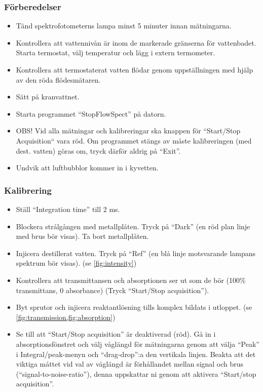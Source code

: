 \subsubsection{Förberedelser}
\begin{itemize}
\item Tänd spektrofotometerns lampa minst 5 minuter innan mätningarna.
\item Kontrollera att vattennivån är inom de markerade gränserna för vattenbadet.
Starta termostat, välj temperatur och lägg i extern termometer.
\item Kontrollera att termostaterat vatten flödar genom uppställningen
  med hjälp av den röda flödesmätaren.
\item Sätt på kranvattnet.
\item Starta programmet ``StopFlowSpect'' på datorn.
\item OBS! Vid alla mätningar och
  kalibreringar ska knappen för ``Start/Stop Acquisition`` vara röd. Om
  programmet stängs av måste kalibreringen (med dest. vatten) göras om,
  tryck därför aldrig på ``Exit''.
\item Undvik att luftbubblor kommer in i kyvetten.
\end{itemize}

\subsubsection{Kalibrering}
\begin{itemize}
\item Ställ ``Integration time'' till 2 ms.
\item Blockera strålgången med metallplåten. Tryck på ``Dark'' (en röd
  plan linje med brus bör visas). Ta bort
  metallplåten.
\item Injicera destillerat vatten. Tryck på ``Ref'' (en blå linje
  motsvarande lampans spektrum bör visas). (se \cref{fig:intensity})
\item Kontrollera att transmittansen och absorptionen ser ut som de
  bör (100\% transmittans, 0 absorbance) (Tryck ``Start/Stop acquisition'').
\item Byt sprutor och injicera reaktantlösning tills komplex bildats i
  utloppet. (se \cref{fig:transmission,fig:absorption})
\item Se till att ``Start/Stop acquisition'' är deaktiverad (röd). Gå in i
  absorptionsfönstret och välj våglängd för mätningarna genom att välja
  ``Peak'' i Integral/peak-menyn och ``drag-drop'':a den vertikala
  linjen. Beakta att det viktiga måttet vid val av våglängd är
  förhållandet mellan signal och brus (``signal-to-noise-ratio''), denna
  uppskattar ni genom att aktivera ``Start/stop acquisition''.
\end{itemize}

